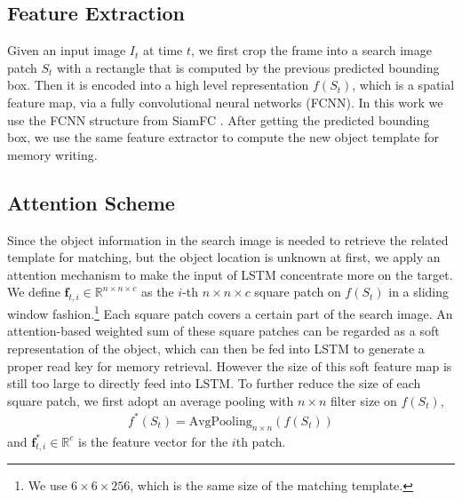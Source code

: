 \documentclass[runningheads]{llncs}
\newcommand{\yty}[1]{\textcolor{black}{#1}}
\begin{document}
\subsection{Feature Extraction}

Given an input image $I_t$ at time $t$, we first crop the frame into a search image patch $S_t$ with a rectangle that is computed by the previous predicted bounding box. Then it is encoded into a high level representation $f(S_t)$, which is a spatial feature map, via a fully convolutional neural networks (FCNN).  In this work we use the FCNN structure from SiamFC \cite{Bertinetto2016}. 
After getting the predicted bounding box, we use the same feature extractor to compute the new object template for memory writing.

%

\subsection{Attention Scheme}

Since the object information in the search image is needed to retrieve the related template for matching, but the object location is unknown at first, we apply an attention mechanism to make the input of LSTM concentrate more on the target.
We define $\mathbf{f}_{t,i} \in \mathbb{R}^{n \times n \times c}$ as the $i$-th $\mathit{n\times n\times c}$ square patch on $f(S_t)$ in a sliding window fashion.\footnote{We use $6\times6\times256$, which is the same size of the matching template.}
Each square patch covers a certain part of the search image. An attention-based weighted sum of these square patches can be regarded as a soft representation of the object, which can then be fed into LSTM to generate a proper read key for memory retrieval. However the size of this soft feature map is still too large to directly feed into LSTM. 
%
To further reduce the size of each square patch, %
we first adopt an average pooling with $n\times n$ filter size on $f(S_t)$,
\begin{align}
f^*(S_t) = \text{AvgPooling}_{n\times n}(f(S_t))
\end{align}
and $\mathbf{f}^*_{t,i} \in \mathbb{R}^{c}$ is the feature vector %
for the $i$th patch. 
\end{document}
